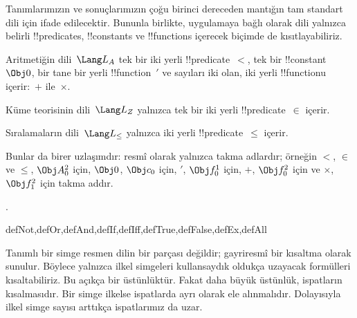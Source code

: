Tanımlarımızın ve sonuçlarımızın çoğu birinci dereceden mantığın tam
standart dili için ifade edilecektir. Bununla birlikte, uygulamaya bağlı
olarak dili yalnızca belirli !!{predicate}s, !!{constant}s ve
!!{function}s içerecek biçimde de kısıtlayabiliriz.

\begin{ex}
Aritmetiğin dili~$\Lang L_A$ tek bir iki yerli !!{predicate}~$<$, tek
bir !!{constant}~$\Obj 0$, bir tane bir yerli !!{function}~$\prime$ ve
sayıları iki olan, iki yerli !!{function}{}u içerir:~$+$ ile~$\times$.
\end{ex}

\begin{ex}
Küme teorisinin dili~$\Lang L_Z$ yalnızca tek bir iki yerli
!!{predicate}~$\in$ içerir.
\end{ex}

\begin{ex}
Sıralamaların dili~$\Lang L_\le$ yalnızca iki yerli
!!{predicate}~$\le$ içerir.
\end{ex}

Bunlar da birer uzlaşımdır: resmî olarak yalnızca takma adlardır;
örneğin $<$, $\in$ ve $\le$, $\Obj A^2_0$ için, $\Obj 0$, $\Obj c_0$ için,
$\prime$, $\Obj f^1_0$ için, $+$, $\Obj f^2_0$ için ve $\times$,
$\Obj f^2_1$ için takma addır.

.

\begin{tagblock}{defNot,defOr,defAnd,defIf,defIff,defTrue,defFalse,defEx,defAll}
\begin{explain}
Tanımlı bir simge resmen dilin bir parçası değildir; gayriresmî bir
kısaltma olarak sunulur. Böylece yalnızca ilkel simgeleri kullansaydık
oldukça uzayacak formülleri kısaltabiliriz. Bu açıkça bir üstünlüktür.
Fakat daha büyük üstünlük, ispatların kısalmasıdır. Bir simge ilkelse
ispatlarda ayrı olarak ele alınmalıdır. Dolayısıyla ilkel simge sayısı
arttıkça ispatlarımız da uzar.
\end{explain}
\end{tagblock}


